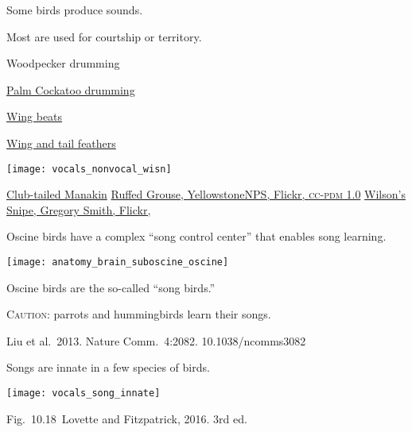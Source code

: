 \documentclass[t]{beamer}
\newcommand{\cornell}[1]{Fig.~#1~Lovette and Fitzpatrick, 2016. 3rd ed.}
\begin{document}
\begin{frame}{Some birds produce  sounds.}

\begin{multicols}{2}

Most are used for courtship or territory.

\hangpara Woodpecker drumming

\hangpara \href{https://www.youtube.com/watch?v=2MIoXh_ORMw}{Palm Cockatoo drumming}

\hangpara \href{https://www.youtube.com/watch?v=9BrJghW-WEk}{Wing beats}

\hangpara \href{https://youtu.be/-_1pyFEYptI}{Wing and tail feathers}

\columnbreak

\centering

\noindent {}

\smallskip

\noindent\texttt{[image: vocals\_nonvocal\_wisn]}

\end{multicols}

\vfilll

\tiny \href{https://www.youtube.com/watch?v=tSHjhCN6NC0}{Club-tailed Manakin} 
\hfill
\href{https://www.flickr.com/photos/80223459@N05/15116108746}{Ruffed Grouse, YellowstoneNPS, Flickr, \textsc{cc-pdm 1.0}}
\hfill
\href{https://www.flickr.com/photos/22170893@N06/11635736575}{Wilson's Snipe, Gregory Smith, Flickr, }

\end{frame}

\begin{frame}{Oscine birds have a complex “song control center” that enables song learning.}
	
	\texttt{[image: anatomy\_brain\_suboscine\_oscine]}
	
	\smallskip
	
	Oscine birds are the so-called “song birds.” 
	
	\smallskip
	
	\textsc{Caution:} parrots and hummingbirds learn their songs.
	
	
	\tinyfill Liu et al.~2013. Nature Comm.~4:2082. 10.1038/ncomms3082
	
	
\end{frame}

\begin{frame}{Songs are innate in a few species of birds.}

\texttt{[image: vocals\_song\_innate]}

\vfilll

\tinyfill \cornell{10.18}
\end{frame}
\end{document}
